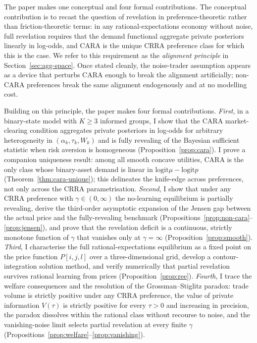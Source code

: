 \documentclass[12pt,letterpaper]{article}
\theoremstyle{definition}
\theoremstyle{remark}
\newcommand{\logit}{\mathrm{logit}}
\newcommand{\1}{\mathbf{1}}
\begin{document}
The paper makes one conceptual and four formal contributions. The
conceptual contribution is to recast the question of revelation in
preference-theoretic rather than friction-theoretic terms: in any
rational-expectations economy without noise, full revelation requires
that the demand functional aggregate private posteriors linearly in
log-odds, and CARA is the unique CRRA preference class for which this is
the case. We refer to this requirement as the \emph{alignment principle}
in Section~\ref{sec:agg-space}. Once stated cleanly, the noise-trader
assumption appears as a device that perturbs CARA enough to break the
alignment artificially; non-CARA preferences break the same alignment
endogenously and at no modelling cost.

Building on this principle, the paper makes four formal contributions.
\emph{First}, in a binary-state model with $K\geq 3$ informed groups, I
show that the CARA market-clearing condition aggregates private posteriors
in log-odds for arbitrary heterogeneity in $(\alpha_{k},\tau_{k},W_{k})$
and is fully revealing of the Bayesian sufficient statistic when risk
aversion is homogeneous (Proposition~\ref{prop:cara}). I prove a
companion uniqueness result: among all smooth concave utilities, CARA
is the only class whose binary-asset demand is linear in $\logit\mu-\logit p$
(Theorem~\ref{thm:cara-unique}); this delineates the knife-edge across
preferences, not only across the CRRA parametrisation. \emph{Second}, I
show that under any CRRA preference with $\gamma\in(0,\infty)$ the
no-learning equilibrium is partially revealing, derive the third-order
asymptotic expansion of the Jensen gap between the actual price and the
fully-revealing benchmark
(Propositions~\ref{prop:non-cara}--\ref{prop:jensen}), and prove that the
revelation deficit is a continuous, strictly monotone function of $\gamma$
that vanishes only at $\gamma=\infty$ (Proposition~\ref{prop:smooth}).
\emph{Third}, I characterise the full rational-expectations equilibrium as
a fixed point on the price function $P[i,j,l]$ over a three-dimensional
grid, develop a contour-integration solution method, and verify
numerically that partial revelation survives rational learning from prices
(Proposition~\ref{prop:ree}). \emph{Fourth}, I trace the welfare
consequences and the resolution of the Grossman--Stiglitz paradox: trade
volume is strictly positive under any CRRA preference, the value of
private information $V(\tau)$ is strictly positive for every $\tau>0$ and
increasing in precision, the paradox dissolves within the rational class
without recourse to noise, and the vanishing-noise limit selects partial
revelation at every finite $\gamma$
(Propositions~\ref{prop:welfare}--\ref{prop:vanishing}).
\end{document}

